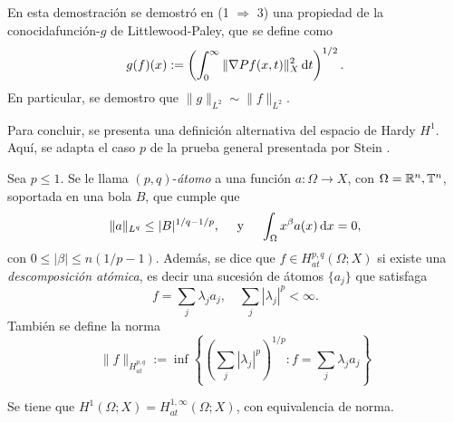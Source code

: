 \begin{remark}
	En esta demostración se demostró en (1 $\Rightarrow$ 3) una propiedad de la conocidafunción-$g$ de Littlewood-Paley, que se define como 
	\begin{equation*}
		g(f)(x) := \left(\int_0^\infty \|\nabla Pf(x, t)\|_X^2 \mathop{}\!\mathrm{d} t\right)^{1/2}.
	\end{equation*}
	En particular, se demostro que $\|g\|_{L^2} \sim \|f\|_{L^2}$.
\end{remark}
Para concluir, se presenta una definición alternativa del espacio de Hardy $H^1$. Aquí, se adapta el caso $p$ de la prueba general presentada por Stein \cite{stein}.
\begin{definition}
	Sea $p\leq 1$. Se le llama $(p,q)$-\textit{átomo} a una función $a:\Omega\to X$, con $\Omega=\mathbb{R}^n,\mathbb{T}^n$, soportada en una bola $B$, que cumple que 
	\begin{equation*}
		\|a\|_{L^q} \leq |B|^{1/q-1/p}, \quad \text{ y } \quad \int_{\Omega}x^\beta a(x) \mathop{}\!\mathrm{d} x = 0,
	\end{equation*}
	con $0\leq|\beta|\leq n(1/p-1)$.
	Además, se dice que $f\in H^{p,q}_{at}(\Omega;X)$ si existe una \textit{descomposición atómica}, es decir una sucesión de átomos $\{a_j\}$ que satisfaga
	\begin{equation*}
		f = \sum_j \lambda_j a_j, \quad \sum_j |\lambda_j|^p < \infty.
	\end{equation*}
	También se define la norma 
	\begin{equation*}
		\|f\|_{H^{p,q}_{at}} := \inf \left\{\left(\sum_j |\lambda_j|^p\right)^{1/p} : f=\sum_j\lambda_j a_j \right\}
	\end{equation*}
\end{definition}
\begin{theorem}
	Se tiene que $H^1(\Omega;X) = H^{1,\infty}_{at}(\Omega;X)$, con equivalencia de norma.
\end{theorem}
